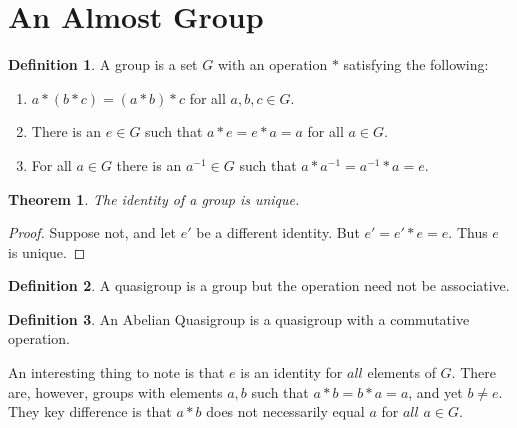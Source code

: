 \documentclass[oneside]{book}
\newtheorem{theorem}{Theorem}[section]
\theoremstyle{definition}
\newtheorem{definition}{Definition}[section]
\begin{document}
\section{An Almost Group}

\begin{definition}
A group is a set $G$ with an operation $*$ satisfying the following:
\begin{enumerate}
\item $a*(b*c) = (a*b)*c$ for all $a,b,c\in G$.
\item There is an $e\in G$ such that $a*e=e*a = a$ for all $a\in G$.
\item For all $a\in G$ there is an $a^{-1}\in G$ such that $a*a^{-1}=a^{-1}*a = e$.
\end{enumerate}
\end{definition}

\begin{theorem}
The identity of a group is unique.
\end{theorem}
\begin{proof}
Suppose not, and let $e'$ be a different identity. But $e' = e'*e = e$. Thus $e$ is unique.
\end{proof}

\begin{definition}
A quasigroup is a group but the operation need not be associative.
\end{definition}

\begin{definition}
An Abelian Quasigroup is a quasigroup with a commutative operation.
\end{definition}

An interesting thing to note is that $e$ is an identity for $all$ elements of $G$. There are, however, groups with elements $a,b$ such that $a*b = b*a = a$, and yet $b\ne e$. They key difference is that $a*b$ does not necessarily equal $a$ for $all$ $a\in G$. 
\end{document}
